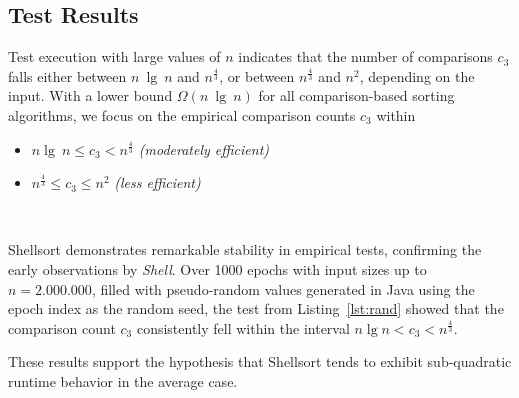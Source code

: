 \subsection{Test Results}

Test execution with large values of $n$ indicates that the number of comparisons $c_3$ falls either between $n\ \lg\ n$ and $n^{\frac{4}{3}}$, or between $n^{\frac{4}{3}}$ and $n^2$, depending on the input.
With a lower bound $\Omega(n\ \lg\ n)$ for all comparison-based sorting algorithms, we focus on the empirical comparison counts $c_3$ within

\begin{itemize}
    \item $n \lg\ n \leq c_3 < n^{\frac{4}{3}}$ \textit{(moderately efficient)}
    \item $n^{\frac{4}{3}} \leq c_3 \leq n^2$ \textit{(less efficient)}
\end{itemize}\\
\vspace{2mm}

\noindent
Shellsort demonstrates remarkable stability in empirical tests, confirming the early observations by \textit{Shell}.
Over 1000 epochs with input sizes up to $n = 2.000.000$, filled with pseudo-random values generated in Java using the epoch index as the random seed, the test from Listing~\ref{lst:rand} showed that the comparison count $c_3$ consistently fell within the interval $n \lg n < c_3 < n^{\frac{4}{3}}$.

\noindent
These results support the hypothesis that Shellsort tends to exhibit sub-quadratic runtime behavior in the average case.


